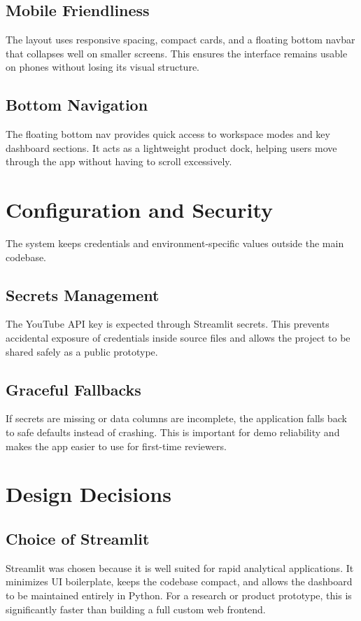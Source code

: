 \subsection{Mobile Friendliness}
The layout uses responsive spacing, compact cards, and a floating bottom navbar that collapses well on smaller screens. This ensures the interface remains usable on phones without losing its visual structure.

\subsection{Bottom Navigation}
The floating bottom nav provides quick access to workspace modes and key dashboard sections. It acts as a lightweight product dock, helping users move through the app without having to scroll excessively.

\section{Configuration and Security}
The system keeps credentials and environment-specific values outside the main codebase.

\subsection{Secrets Management}
The YouTube API key is expected through Streamlit secrets. This prevents accidental exposure of credentials inside source files and allows the project to be shared safely as a public prototype.

\subsection{Graceful Fallbacks}
If secrets are missing or data columns are incomplete, the application falls back to safe defaults instead of crashing. This is important for demo reliability and makes the app easier to use for first-time reviewers.

\section{Design Decisions}
\subsection{Choice of Streamlit}
Streamlit was chosen because it is well suited for rapid analytical applications. It minimizes UI boilerplate, keeps the codebase compact, and allows the dashboard to be maintained entirely in Python. For a research or product prototype, this is significantly faster than building a full custom web frontend.

